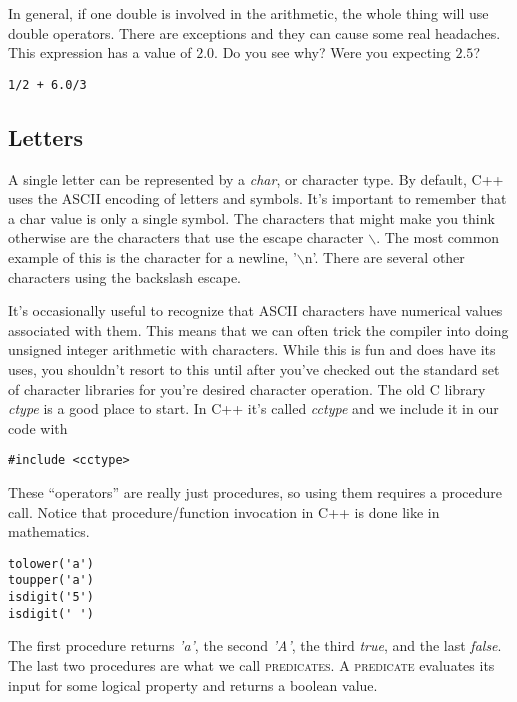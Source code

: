\documentclass[]{tufte-handout}
\begin{document}
In general, if one double is involved in the arithmetic, the whole thing will use double operators. There are exceptions and they can cause some real headaches.  This expression has a value of $2.0$. Do you see why? Were you expecting $2.5$?	
\begin{verbatim}
1/2 + 6.0/3
\end{verbatim}

\subsection{Letters}

A single letter can be represented by a \textit{char}, or character type.  By default, C++ uses the ASCII encoding of letters and symbols. It's important to remember that a char value is only a single symbol.  The characters that might make you think otherwise are the characters that use the escape character $\backslash$.  The most common example of this is the character for a newline, '$\backslash$n'. There are several other characters using the backslash escape.  

It's occasionally useful to recognize that ASCII characters have numerical values associated with them. This means that we can often trick the compiler into doing unsigned integer arithmetic with characters.   While this is fun and does have its uses, you shouldn't resort to this until after you've checked out the standard set of character libraries for you're desired character operation. The old C library \textit{ctype} is a good place to start. In C++ it's called \textit{cctype} and we include it in our code with 
\begin{verbatim}
#include <cctype>
\end{verbatim} 

These ``operators'' are really just procedures, so using them requires a procedure call. Notice that procedure/function invocation in C++ is done like in mathematics.
\begin{verbatim}
tolower('a')
toupper('a')
isdigit('5')
isdigit(' ')
\end{verbatim}
The first procedure returns \textit{'a'}, the second \textit{'A'}, the third \textit{true}, and the last \textit{false}. The last two procedures are what we call \textsc{predicates}. A \textsc{predicate} evaluates its input for some logical property and returns a boolean value.
\end{document}
